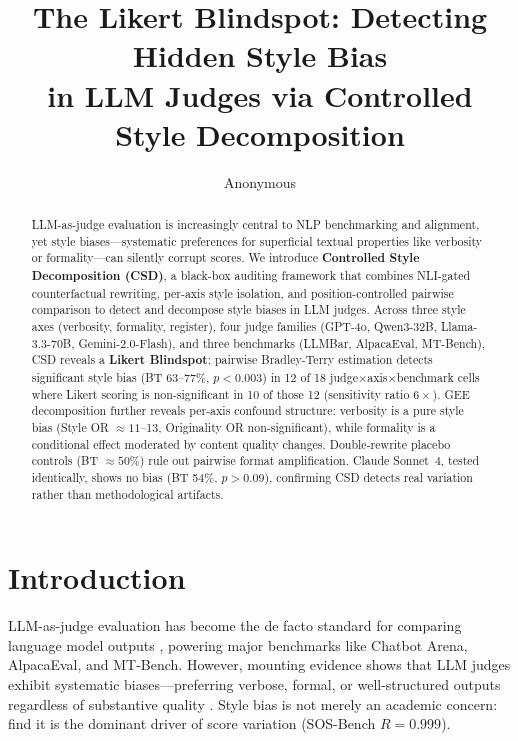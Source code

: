 \documentclass[11pt]{article}
\title{The Likert Blindspot: Detecting Hidden Style Bias\\in LLM Judges via Controlled Style Decomposition}
\author{Anonymous}
\begin{document}
\maketitle

\begin{abstract}
LLM-as-judge evaluation is increasingly central to NLP benchmarking and alignment, yet style biases---systematic preferences for superficial textual properties like verbosity or formality---can silently corrupt scores.
We introduce \textbf{Controlled Style Decomposition (CSD)}, a black-box auditing framework that combines NLI-gated counterfactual rewriting, per-axis style isolation, and position-controlled pairwise comparison to detect and decompose style biases in LLM judges.
Across three style axes (verbosity, formality, register), four judge families (GPT-4o, Qwen3-32B, Llama-3.3-70B, Gemini-2.0-Flash), and three benchmarks (LLMBar, AlpacaEval, MT-Bench), CSD reveals a \textbf{Likert Blindspot}: pairwise Bradley-Terry estimation detects significant style bias (BT 63--77\%, $p < 0.003$) in 12 of 18 judge$\times$axis$\times$benchmark cells where Likert scoring is non-significant in 10 of those 12 (sensitivity ratio $6{\times}$).
GEE decomposition further reveals per-axis confound structure: verbosity is a pure style bias (Style OR $\approx 11$--13, Originality OR non-significant), while formality is a conditional effect moderated by content quality changes.
Double-rewrite placebo controls (BT $\approx 50\%$) rule out pairwise format amplification.
Claude Sonnet~4, tested identically, shows no bias (BT 54\%, $p > 0.09$), confirming CSD detects real variation rather than methodological artifacts.
\end{abstract}

\section{Introduction}
\label{sec:intro}

LLM-as-judge evaluation has become the de facto standard for comparing language model outputs \citep{zheng2023judging,dubois2024alpacafarm}, powering major benchmarks like Chatbot Arena, AlpacaEval, and MT-Bench.
However, mounting evidence shows that LLM judges exhibit systematic biases---preferring verbose, formal, or well-structured outputs regardless of substantive quality \citep{wu2024style,park2024offsetbias,stureborg2024large}.
Style bias is not merely an academic concern: \citet{koo2023benchmarking} find it is the dominant driver of score variation (SOS-Bench $R = 0.999$).
\end{document}
